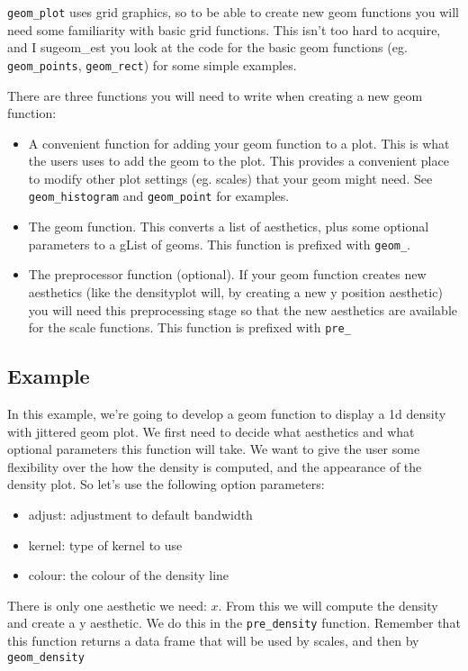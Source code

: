 \texttt{geom_plot} uses grid graphics, so to be able to create new geom functions you will need some familiarity with basic grid functions.  This isn't too hard to acquire, and I sugeom_est you look at the code for the basic geom functions (eg. \texttt{geom\_points}, \texttt{geom\_rect}) for some simple examples.

There are three functions you will need to write when creating a new geom function:

\begin{itemize}
	\item A convenient function for adding your geom function to a plot.  This is what the users uses to add the geom to the plot.  This provides a convenient place to modify other plot settings (eg. scales) that your geom might need.  See \texttt{geom_histogram} and \texttt{geom_point} for examples.
	\item The geom function.  This converts a list of aesthetics, plus some optional parameters to a gList of geoms.  This function is prefixed with \texttt{geom\_}.  
	\item The preprocessor function (optional).  If your geom function creates new aesthetics (like the densityplot will, by creating a new y position aesthetic) you will need this preprocessing stage so that the new aesthetics are available for the scale functions.  This function is prefixed with \texttt{pre\_}
\end{itemize}

\subsection{Example}\label{sub:example}

In this example, we're going to develop a geom function to display a 1d density with jittered geom plot.  We first need to decide what aesthetics and what optional parameters this function will take.  We want to give the user some flexibility over the how the density is computed, and the appearance of the density plot.  So let's use the following option parameters:

\begin{itemize}
	\item adjust: adjustment to default bandwidth
	\item kernel: type of kernel to use
	\item colour: the colour of the density line
\end{itemize}

There is only one aesthetic we need: $x$.  From this we will compute the density and create a y aesthetic.  We do this in the \texttt{pre\_density} function.  Remember that this function returns a data frame that will be used by scales, and then by \texttt{geom\_density}

